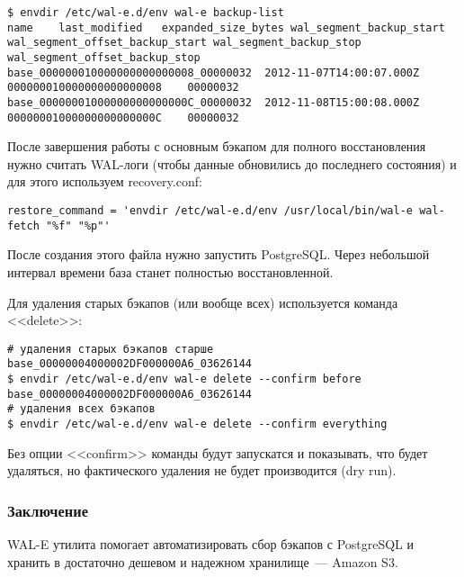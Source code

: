 \begin{lstlisting}[label=lst:wal-e12,caption=Список бэкапов]
$ envdir /etc/wal-e.d/env wal-e backup-list
name	last_modified	expanded_size_bytes	wal_segment_backup_start	wal_segment_offset_backup_start	wal_segment_backup_stop	wal_segment_offset_backup_stop
base_000000010000000000000008_00000032	2012-11-07T14:00:07.000Z		000000010000000000000008	00000032		
base_00000001000000000000000C_00000032	2012-11-08T15:00:08.000Z		00000001000000000000000C	00000032
\end{lstlisting}

После завершения работы с основным бэкапом для полного восстановления нужно считать WAL-логи (чтобы данные обновились до последнего состояния) и для этого используем recovery.conf:

\begin{lstlisting}[label=lst:wal-e13,caption=recovery.conf]
restore_command = 'envdir /etc/wal-e.d/env /usr/local/bin/wal-e wal-fetch "%f" "%p"'
\end{lstlisting}

После создания этого файла нужно запустить PostgreSQL. Через небольшой интервал времени база станет полностью восстановленной. 

Для удаления старых бэкапов (или вообще всех) используется команда <<delete>>:

\begin{lstlisting}[label=lst:wal-e14,caption=Удаление бэкапов]
# удаления старых бэкапов старше base_00000004000002DF000000A6_03626144
$ envdir /etc/wal-e.d/env wal-e delete --confirm before base_00000004000002DF000000A6_03626144
# удаления всех бэкапов
$ envdir /etc/wal-e.d/env wal-e delete --confirm everything
\end{lstlisting}

Без опции <<confirm>> команды будут запускатся и показывать, что будет удаляться, но фактического удаления не будет производится (dry run).

\subsubsection{Заключение}
WAL-E утилита помогает автоматизировать сбор бэкапов с PostgreSQL и хранить в достаточно дешевом и надежном хранилище~--- Amazon S3.